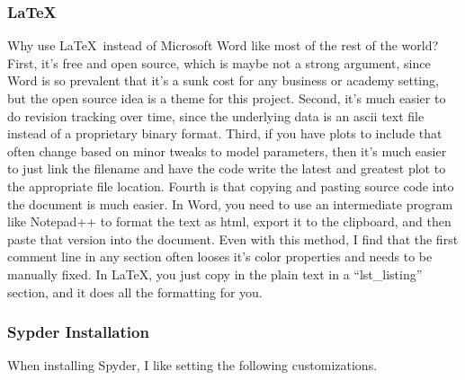 \documentclass[12pt]{article}
\begin{document}
\subsubsection{\LaTeX}
Why use \LaTeX\ instead of Microsoft Word like most of the rest of the world?  First, it's free and open source, which is maybe not a strong argument, since Word is so prevalent that it's a sunk cost for any business or academy setting, but the open source idea is a theme for this project.  Second, it's much easier to do revision tracking over time, since the underlying data is an ascii text file instead of a proprietary binary format.  Third, if you have plots to include that often change based on minor tweaks to model parameters, then it's much easier to just link the filename and have the code write the latest and greatest plot to the appropriate file location.  Fourth is that copying and pasting source code into the document is much easier.  In Word, you need to use an intermediate program like Notepad++ to format the text as html, export it to the clipboard, and then paste that version into the document.  Even with this method, I find that the first comment line in any section often looses it's color properties and needs to be manually fixed.  In \LaTeX, you just copy in the plain text in a ``lst\_listing'' section, and it does all the formatting for you.

\subsubsection{Sypder Installation}\label{h3:Spyder_install}
When installing Spyder, I like setting the following customizations.
\end{document}
